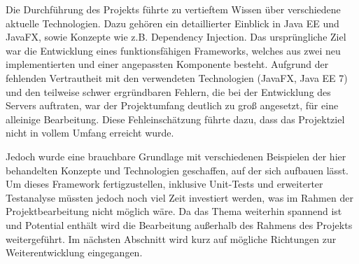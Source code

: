 Die Durchführung des Projekts führte zu vertieftem Wissen über verschiedene aktuelle Technologien.
Dazu gehören ein detaillierter Einblick in Java EE und JavaFX, sowie Konzepte wie z.B. Dependency Injection.
Das ursprüngliche Ziel war die Entwicklung eines funktionsfähigen Frameworks, welches aus zwei neu implementierten und einer angepassten Komponente besteht.
Aufgrund der fehlenden Vertrautheit mit den verwendeten Technologien (JavaFX, Java EE 7) und den teilweise schwer ergründbaren Fehlern, die bei der Entwicklung des Servers auftraten, war der Projektumfang deutlich zu groß angesetzt, für eine alleinige Bearbeitung.
Diese Fehleinschätzung führte dazu, dass das Projektziel nicht in vollem Umfang erreicht wurde.

Jedoch wurde eine brauchbare Grundlage mit verschiedenen Beispielen der hier behandelten Konzepte und Technologien geschaffen, auf der sich aufbauen lässt.
Um dieses Framework fertigzustellen, inklusive Unit-Tests und erweiterter Testanalyse müssten jedoch noch viel Zeit investiert werden, was im Rahmen der Projektbearbeitung nicht möglich wäre.
Da das Thema weiterhin spannend ist und Potential enthält wird die Bearbeitung außerhalb des Rahmens des Projekts weitergeführt.
Im nächsten Abschnitt wird kurz auf mögliche Richtungen zur Weiterentwicklung eingegangen.